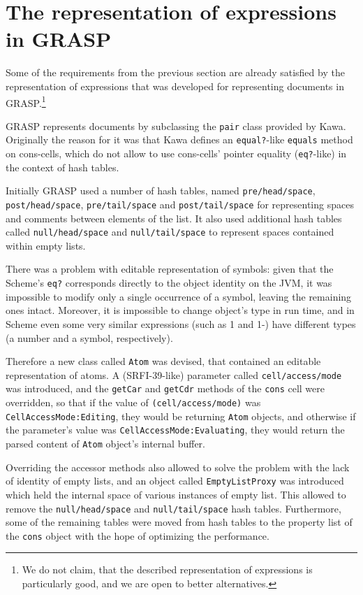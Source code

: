 \documentclass[acmsmall]{acmart}
\begin{document}
\section{The representation of expressions in GRASP}

Some of the requirements from the previous section are already
satisfied by the representation of expressions that was developed for
representing documents in GRASP.\footnote{We do not claim, that the described
representation of expressions is particularly good, and we are open to
better alternatives.}

GRASP represents documents by subclassing the \texttt{pair} class
provided by Kawa. Originally the reason for it was that Kawa defines
an \texttt{equal?}-like \texttt{equals} method on cons-cells, which
do not allow to use cons-cells' pointer equality (\texttt{eq?}-like)
in the context of hash tables.

Initially GRASP used a number of hash tables, named
\texttt{pre\-/head\-/space}, \texttt{post\-/head\-/space},
\texttt{pre\-/tail\-/space} and \texttt{post\-/tail\-/space} for
representing spaces and comments between elements of the list.  It
also used additional hash tables called \texttt{null\-/head\-/space}
and \texttt{null\-/tail\-/space} to represent spaces contained
within empty lists.

There was a problem with editable representation of symbols:
given that the Scheme's \texttt{eq?} corresponds directly to the object
identity on the JVM, it was impossible to modify only a single occurrence
of a symbol, leaving the remaining ones intact. Moreover, it is
impossible to change object's type in run time, and in Scheme even some
very similar expressions (such as 1 and 1-) have different types (a
number and a symbol, respectively).

Therefore a new class called \texttt{Atom} was devised, that contained
an editable representation of atoms. A (SRFI-39-like) parameter called
\texttt{cell\-/access\-/mode} was introduced, and the \texttt{getCar}
and \texttt{getCdr} methods of the \texttt{cons} cell were overridden,
so that if the value of \texttt{(cell\-/access\-/mode)} was
\texttt{Cell\-Access\-Mode\-:Editing}, they would be returning
\texttt{Atom} objects, and otherwise if the parameter's value was
\texttt{Cell\-Access\-Mode\-:Evaluating}, they would return the parsed
content of \texttt{Atom} object's internal buffer.

Overriding the accessor methods also allowed to solve the problem with
the lack of identity of empty lists, and an object called
\texttt{Empty\-List\-Proxy} was introduced which held the internal
space of various instances of empty list. This allowed to remove the
\texttt{null\-/head\-/space} and \texttt{null\-/tail\-/space} hash
tables. Furthermore, some of the remaining tables were moved from hash
tables to the property list of the \texttt{cons} object with the hope
of optimizing the performance.
\end{document}
